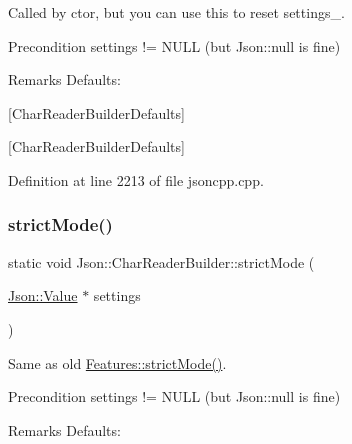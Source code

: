 Called by ctor, but you can use this to reset settings\+\_\+. \begin{DoxyPrecond}{Precondition}
\textquotesingle{}settings\textquotesingle{} != N\+U\+LL (but Json\+::null is fine) 
\end{DoxyPrecond}
\begin{DoxyRemark}{Remarks}
Defaults\+: 
\begin{DoxyCodeInclude}
\end{DoxyCodeInclude}

\end{DoxyRemark}
\mbox{[}Char\+Reader\+Builder\+Defaults\mbox{]}

\mbox{[}Char\+Reader\+Builder\+Defaults\mbox{]} 

Definition at line 2213 of file jsoncpp.\+cpp.

\hypertarget{class_json_1_1_char_reader_builder_a62a6e55ae25c756994ee273f7d16044a}{}\label{class_json_1_1_char_reader_builder_a62a6e55ae25c756994ee273f7d16044a} 
\subsubsection{\texorpdfstring{strict\+Mode()}{strictMode()}\hspace{0.1cm}{\footnotesize\ttfamily [1/2]}}
{\footnotesize\ttfamily static void Json\+::\+Char\+Reader\+Builder\+::strict\+Mode (\begin{DoxyParamCaption}\item[{\hyperlink{class_json_1_1_value}{Json\+::\+Value} $\ast$}]{settings }\end{DoxyParamCaption})\hspace{0.3cm}{\ttfamily [static]}}

Same as old \hyperlink{class_json_1_1_features_ae23176c14b2e79e81fb61fb1a8ab58ee}{Features\+::strict\+Mode()}. \begin{DoxyPrecond}{Precondition}
\textquotesingle{}settings\textquotesingle{} != N\+U\+LL (but Json\+::null is fine) 
\end{DoxyPrecond}
\begin{DoxyRemark}{Remarks}
Defaults\+: 
\begin{DoxyCodeInclude}
\end{DoxyCodeInclude}

\end{DoxyRemark}
\hypertarget{class_json_1_1_char_reader_builder_a9c19e3c5475f9072d527810d4bf56749}{}\label{class_json_1_1_char_reader_builder_a9c19e3c5475f9072d527810d4bf56749} 
